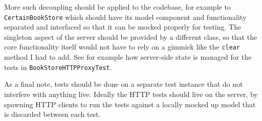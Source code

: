 More such decoupling should be applied to the codebase, for example to
\texttt{CertainBookStore} which should have its model component and
functionality separated and interfaced so that it can be mocked properly for
testing. The singleton aspect of the server should be provided by a different
class, so that the core functionality itself would not have to rely on a gimmick
like the \texttt{clear} method I had to add. See for example how server-side
state is managed for the tests in \texttt{BookStoreHTTPProxyTest}.

As a final note, tests should be done on a separate test instance that do not
interfere with anything live. Ideally the HTTP tests should live on the server,
by spawning HTTP clients to run the tests against a locally mocked up model that
is discarded between each test.
